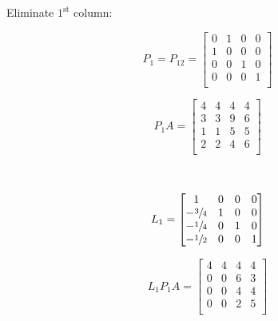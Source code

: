 \documentclass[12pt]{article}
\begin{document}
\newcommand{\pushright}[1]{\ifmeasuring@#1\else\omit\hfill$\displaystyle#1$\fi\ignorespaces}
Eliminate $1^\text{st}$ column:\\
\begin{minipage}[t]{0.5\textwidth}
    $$
        P_1 = P_{12} =
        \begin{bmatrix}
            0 & 1 & 0 & 0 \\
            1 & 0 & 0 & 0 \\
            0 & 0 & 1 & 0 \\
            0 & 0 & 0 & 1 \\
        \end{bmatrix}
    $$
\end{minipage}
\begin{minipage}[t]{0.5\textwidth}
    $$
        P_1A=
        \begin{bmatrix}
            4 & 4 & 4 & 4 \\
            3 & 3 & 9 & 6 \\
            1 & 1 & 5 & 5 \\
            2 & 2 & 4 & 6 \\
        \end{bmatrix}
    $$
\end{minipage}\\
\begin{minipage}[t]{0.5\textwidth}
    $$
        L_1=
        \begin{bmatrix}
            1             & 0 & 0 & 0 \\
            -\sfrac{3}{4} & 1 & 0 & 0 \\
            -\sfrac{1}{4} & 0 & 1 & 0 \\
            -\sfrac{1}{2} & 0 & 0 & 1 \\
        \end{bmatrix}
    $$
\end{minipage}
\begin{minipage}[t]{0.5\textwidth}
    $$
        L_1P_1A=
        \begin{bmatrix}
            4 & 4 & 4 & 4 \\
            0 & 0 & 6 & 3 \\
            0 & 0 & 4 & 4 \\
            0 & 0 & 2 & 5 \\
        \end{bmatrix}
    $$
\end{minipage}
\end{document}
